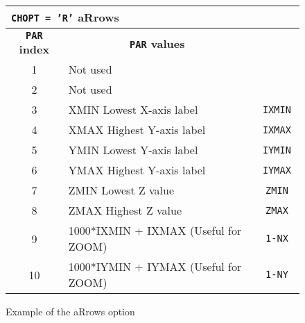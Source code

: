 \begin{figure}[p]
\begin{center}
\begin{tabular}{||c|p{}|>{\tt}r||}
\hline
\multicolumn{3}{||l||}{\bf {\tt CHOPT = 'R'} aRrows}       \\
\hline
\multicolumn{1}{||c|}{\bf {\tt PAR} index}       &
\multicolumn{1}{c|}{\bf {\tt PAR} values}        &
\multicolumn{1}{c||}{\bf default}                          \\
\hline
1  & Not used                                                       &         \\
2  & Not used                                                       &         \\
3  & XMIN Lowest X-axis label                                       &   IXMIN \\
4  & XMAX Highest Y-axis label                                      &   IXMAX \\
5  & YMIN Lowest Y-axis label                                       &   IYMIN \\
6  & YMAX Highest Y-axis label                                      &   IYMAX \\
7  & ZMIN Lowest Z value                                            &   ZMIN  \\
8  & ZMAX Highest Z value                                           &   ZMAX  \\
9  & 1000*IXMIN + IXMAX (Useful for ZOOM)                           &   1-NX  \\
10 & 1000*IYMIN + IYMAX (Useful for ZOOM)                           &   1-NY  \\
\hline
\end{tabular}
\end{center}

\bigskip

\begin{center} \mbox{} \end{center}
\caption{Example of the \protect{} aRrows option}
\label{ARROWS}
\end{figure}

